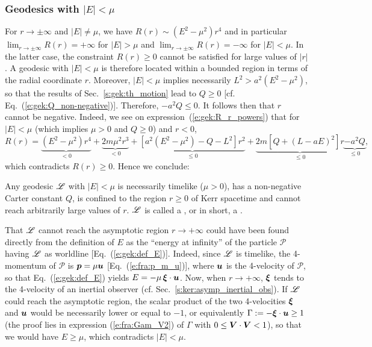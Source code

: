 \subsubsection{Geodesics with $|E|<\mu$} \label{s:gek:bound_geod}

For $r\to \pm\infty$ and $|E|\neq \mu$,
we have $R(r) \sim (E^2 - \mu^2) r^4$ and in
particular $\lim_{r\to\pm\infty} R(r) = + \infty$ for $|E|>\mu$
and $\lim_{r\to\pm\infty} R(r) = - \infty$ for $|E|<\mu$. In the latter case,
the constraint $R(r) \geq 0$ cannot be satisfied for large values
of $|r|$. A geodesic with $|E|<\mu$ is therefore located within a bounded
region in terms of the radial coordinate $r$. Moreover, $|E|<\mu$
implies necessarily $L^2 > a^2 (E^2 - \mu^2)$, so that
the results of
Sec.~\ref{s:gek:th_motion} lead to $Q\geq 0$
[cf. Eq.~(\ref{e:gek:Q_non-negative})]. Therefore, $-a^2 Q \leq 0$.
It follows then that $r$ cannot be negative.
Indeed, we see
on expression~(\ref{e:gek:R_r_powers}) that for $|E|<\mu$ (which implies $\mu>0$ and $Q\geq 0$) and $r<0$,
\[
    R(r) = \underbrace{(E^2 - \mu^2) r^4}_{<0} + \underbrace{2 m \mu^2 r^3}_{<0}
     + \underbrace{\left[ a^2 (E^2 - \mu^2) - Q - L^2 \right] r^2}_{\leq 0}
     + \underbrace{2m\left[ Q + (L - a E)^2 \right] r}_{\leq 0}
     \underbrace{-a^2 Q}_{\leq 0} ,
\]
which contradicts $R(r)\geq 0$.
Hence we conclude:
\begin{prop}
\label{p:gek:bound_orbits}
Any geodesic $\mathscr{L}$ with $|E|<\mu$ is necessarily timelike ($\mu >0$),
has a non-negative Carter constant $Q$,
is confined to the region $r\geq 0$ of Kerr spacetime
and cannot reach arbitrarily large values of $r$. $\mathscr{L}$ is called a
,
or in short, a .
\end{prop}
\begin{remark} \label{r:gek:bound_geod}
That $\mathscr{L}$
cannot reach the asymptotic region $r\to +\infty$ could have been
found directly from the definition of $E$ as the ``energy at infinity''
of the particle $\mathscr{P}$ having $\mathscr{L}$ as worldline
[Eq.~(\ref{e:gek:def_E})]. Indeed, since $\mathscr{L}$ is timelike, the 4-momentum
of $\mathscr{P}$ is $\bm{p} = \mu \bm{u}$ [Eq.~(\ref{e:fra:p_m_u})], where
$\bm{u}$ is the 4-velocity of $\mathscr{P}$, so that Eq.~(\ref{e:gek:def_E})
yields $E = - \mu\, \bm{\xi}\cdot\bm{u}$. Now, when $r\to +\infty$, $\bm{\xi}$
tends to the 4-velocity of an inertial observer (cf. Sec.~\ref{s:ker:asymp_inertial_obs}).
If $\mathscr{L}$ could reach the asymptotic region,
the scalar
product of the two 4-velocities $\bm{\xi}$ and
$\bm{u}$ would be necessarily lower or equal to $-1$, or equivalently
$\Gamma := - \bm{\xi}\cdot\bm{u} \geq 1$ (the proof lies in expression
(\ref{e:fra:Gam_V2}) of $\Gamma$ with $0\leq \bm{V}\cdot\bm{V} < 1$), so that
we would have $E \geq \mu$, which contradicts $|E|<\mu$.
\end{remark}

